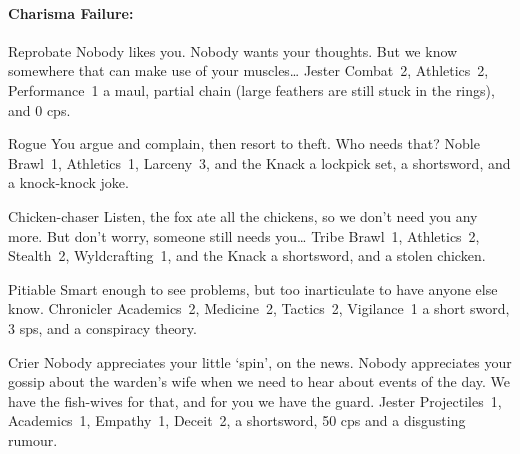 \begin{multicols}{2}
\begin{itemize}
\end{itemize}

\paragraph{Charisma Failure:}

\begin{itemize}

  {Reprobate}%
  {Nobody likes you.
  Nobody wants your thoughts.
  But we know somewhere that can make use of your muscles\ldots
  }%
  {Jester}%
  {Combat~2, Athletics~2, Performance~1}%
  {a maul, partial chain (large feathers are still stuck in the rings), and 0 \glspl{cp}.}%

  {Rogue}%
  {You argue and complain, then resort to theft.
  Who needs that?
  }%
  {Noble}%
  {Brawl~1, Athletics~1, Larceny~3, and the Knack \lucky}%
  {a lockpick set, a shortsword, and a knock-knock joke.}%

  {Chicken-chaser}%
  {Listen, the fox ate all the chickens, so we don't need you any more.
  But don't worry, someone still needs you\ldots
  }%
  {Tribe}%
  {Brawl~1, Athletics~2, Stealth~2, Wyldcrafting~1, and the Knack \lucky}%
  {a shortsword, and a stolen chicken.}%

  {Pitiable}%
  {Smart enough to see problems, but too inarticulate to have anyone else know.
  }%
  {Chronicler}%
  {Academics~2, Medicine~2, Tactics~2, Vigilance~1}%
  {a short sword, 3 \glspl{sp}, and a conspiracy theory.}%

  {Crier}%
  {Nobody appreciates your little `spin', on the news.
  Nobody appreciates your gossip about the warden's wife when we need to hear about events of the day.
  We have the fish-wives for that, and for you we have the \gls{guard}.
  }%
  {Jester}%
  {Projectiles~1, Academics~1, Empathy~1, Deceit~2, }%
  {a shortsword, 50 \glspl{cp} and a disgusting rumour.}%

\end{itemize}

\end{multicols}
